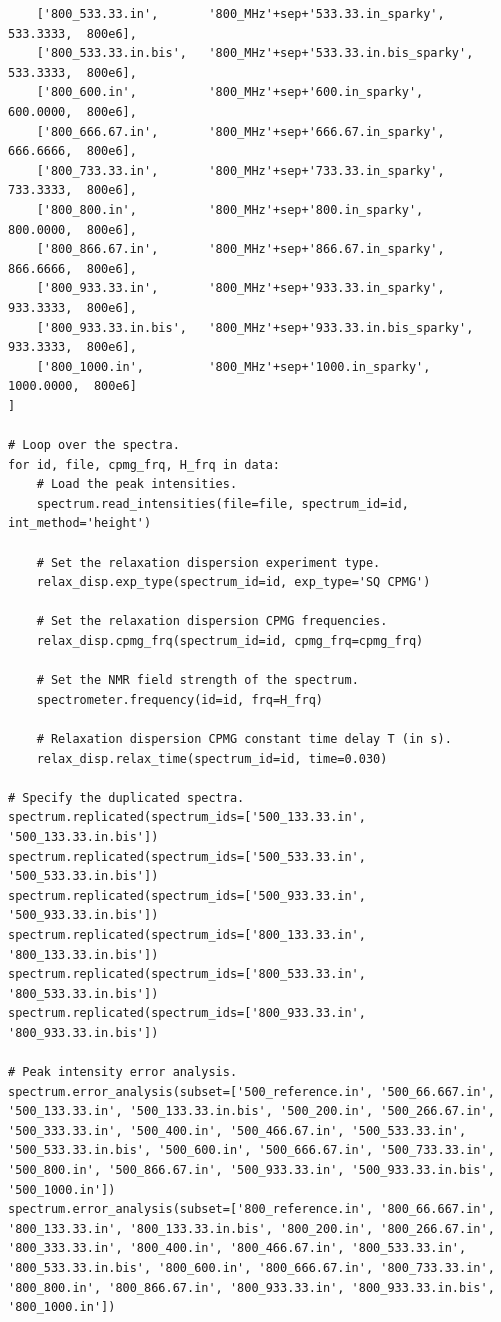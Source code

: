 \begin{lstlisting}
    ['800_533.33.in',       '800_MHz'+sep+'533.33.in_sparky',          533.3333,  800e6],
    ['800_533.33.in.bis',   '800_MHz'+sep+'533.33.in.bis_sparky',      533.3333,  800e6],
    ['800_600.in',          '800_MHz'+sep+'600.in_sparky',             600.0000,  800e6],
    ['800_666.67.in',       '800_MHz'+sep+'666.67.in_sparky',          666.6666,  800e6],
    ['800_733.33.in',       '800_MHz'+sep+'733.33.in_sparky',          733.3333,  800e6],
    ['800_800.in',          '800_MHz'+sep+'800.in_sparky',             800.0000,  800e6],
    ['800_866.67.in',       '800_MHz'+sep+'866.67.in_sparky',          866.6666,  800e6],
    ['800_933.33.in',       '800_MHz'+sep+'933.33.in_sparky',          933.3333,  800e6],
    ['800_933.33.in.bis',   '800_MHz'+sep+'933.33.in.bis_sparky',      933.3333,  800e6],
    ['800_1000.in',         '800_MHz'+sep+'1000.in_sparky',           1000.0000,  800e6]
]

# Loop over the spectra.
for id, file, cpmg_frq, H_frq in data:
    # Load the peak intensities.
    spectrum.read_intensities(file=file, spectrum_id=id, int_method='height')

    # Set the relaxation dispersion experiment type.
    relax_disp.exp_type(spectrum_id=id, exp_type='SQ CPMG')

    # Set the relaxation dispersion CPMG frequencies.
    relax_disp.cpmg_frq(spectrum_id=id, cpmg_frq=cpmg_frq)

    # Set the NMR field strength of the spectrum.
    spectrometer.frequency(id=id, frq=H_frq)

    # Relaxation dispersion CPMG constant time delay T (in s).
    relax_disp.relax_time(spectrum_id=id, time=0.030)

# Specify the duplicated spectra.
spectrum.replicated(spectrum_ids=['500_133.33.in', '500_133.33.in.bis'])
spectrum.replicated(spectrum_ids=['500_533.33.in', '500_533.33.in.bis'])
spectrum.replicated(spectrum_ids=['500_933.33.in', '500_933.33.in.bis'])
spectrum.replicated(spectrum_ids=['800_133.33.in', '800_133.33.in.bis'])
spectrum.replicated(spectrum_ids=['800_533.33.in', '800_533.33.in.bis'])
spectrum.replicated(spectrum_ids=['800_933.33.in', '800_933.33.in.bis'])

# Peak intensity error analysis.
spectrum.error_analysis(subset=['500_reference.in', '500_66.667.in', '500_133.33.in', '500_133.33.in.bis', '500_200.in', '500_266.67.in', '500_333.33.in', '500_400.in', '500_466.67.in', '500_533.33.in', '500_533.33.in.bis', '500_600.in', '500_666.67.in', '500_733.33.in', '500_800.in', '500_866.67.in', '500_933.33.in', '500_933.33.in.bis', '500_1000.in'])
spectrum.error_analysis(subset=['800_reference.in', '800_66.667.in', '800_133.33.in', '800_133.33.in.bis', '800_200.in', '800_266.67.in', '800_333.33.in', '800_400.in', '800_466.67.in', '800_533.33.in', '800_533.33.in.bis', '800_600.in', '800_666.67.in', '800_733.33.in', '800_800.in', '800_866.67.in', '800_933.33.in', '800_933.33.in.bis', '800_1000.in'])


\end{lstlisting}
